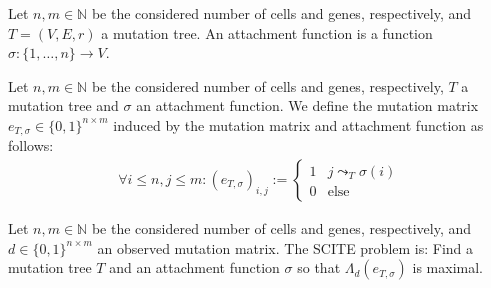 \begin{definition}
    \label{def:attachment}
    Let $n, m \in \mathbb{N}$ be the considered number of cells and genes, respectively, and $T = (V, E, r)$ a mutation tree. An attachment function is a function $\sigma: \{1, \dots, n\} \rightarrow V$.
\end{definition}

\begin{definition}
    \label{def:induced_mutmatrix}
    Let $n, m \in \mathbb{N}$ be the considered number of cells and genes, respectively, $T$ a mutation tree and $\sigma$ an attachment function. We define the mutation matrix $e_{T, \sigma} \in \{0,1\}^{n \times m}$ induced by the mutation matrix and attachment function as follows:
    \begin{align*}
        \forall i \leq n, j \leq m: (e_{T, \sigma})_{i,j} := \begin{cases}
            1 & j \leadsto_T \sigma(i) \\
            0 & \mathrm{else}
        \end{cases}
    \end{align*}
\end{definition}

\begin{definition}
    \label{def:scite_problem}
    Let $n, m \in \mathbb{N}$ be the considered number of cells and genes, respectively, and $d \in \{0,1\}^{n \times m}$ an observed mutation matrix. The SCITE problem is: Find a mutation tree $T$ and an attachment function $\sigma$ so that $\Lambda_d(e_{T, \sigma})$ is maximal.
\end{definition}